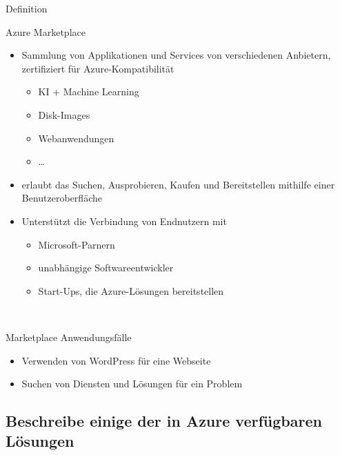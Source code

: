 \documentclass{scrartcl}
\newenvironment{flashcard}[2][]{%
    #1
    \vfill
    \centerline{\Large{#2}}
    \vfill
\newpage
}
{\newpage}
\newcommand{\subsectioncard}[1]{
    \vspace*{\stretch{1}}
    \subsection{#1}
    \vspace*{\stretch{1}}
    \pagebreak
}
\begin{document}
    \begin{flashcard}[Definition]{Azure Marketplace}
        \begin{itemize}
            \item Sammlung von Applikationen und Services\newline
            von verschiedenen Anbietern, zertifiziert für Azure-Kompatibilität
            \begin{itemize}
                \item KI + Machine Learning
                \item Disk-Images
                \item Webanwendungen
                \item \ldots
            \end{itemize}
            \item erlaubt das Suchen, Ausprobieren, Kaufen und Bereitstellen mithilfe einer Benutzeroberfläche
            \item Unterstützt die Verbindung von Endnutzern mit
            \begin{itemize}
                \item Microsoft-Parnern
                \item unabhängige Softwareentwickler
                \item Start-Ups, die Azure-Lösungen bereitstellen
            \end{itemize}
        \end{itemize}
    \end{flashcard}

    \begin{flashcard}[\ ]{Marketplace Anwendungsfälle}
            \begin{itemize}
                \item Verwenden von WordPress für eine Webseite
                \item Suchen von Diensten und Lösungen für ein Problem
            \end{itemize}
    \end{flashcard}

    \subsectioncard{Beschreibe einige der in Azure verfügbaren Lösungen}
\end{document}
